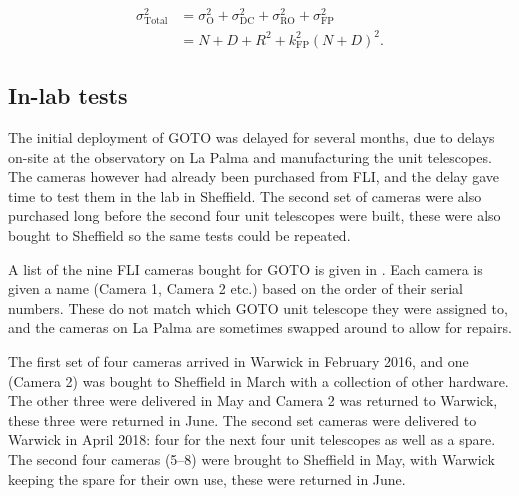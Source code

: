 \begin{colsection}
\begin{colsection}
\begin{equation}
    \begin{split}
        \sigma_\text{Total}^2 & = \sigma_\text{O}^2 +
                                  \sigma_\text{DC}^2 +
                                  \sigma_\text{RO}^2 +
                                  \sigma_\text{FP}^2 \\
                              & = N + D + R^2 + k_\text{FP}^2{(N+D)}^2.
    \end{split}
    \label{eq:noise}
\end{equation}

\end{colsection}

\newpage
\subsection{In-lab tests}
\label{sec:camera_tests}
\begin{colsection}

The initial deployment of GOTO was delayed for several months, due to delays on-site at the observatory on La Palma and manufacturing the unit telescopes. The cameras however had already been purchased from FLI, and the delay gave time to test them in the lab in Sheffield. The second set of cameras were also purchased long before the second four unit telescopes were built, these were also bought to Sheffield so the same tests could be repeated.

A list of the nine FLI cameras bought for GOTO is given in . Each camera is given a name (Camera 1, Camera 2 etc.) based on the order of their serial numbers. These do not match which GOTO unit telescope they were assigned to, and the cameras on La Palma are sometimes swapped around to allow for repairs.

The first set of four cameras arrived in Warwick in February 2016, and one (Camera 2) was bought to Sheffield in March with a collection of other hardware. The other three were delivered in May and Camera 2 was returned to Warwick, these three were returned in June. The second set cameras were delivered to Warwick in April 2018: four for the next four unit telescopes as well as a spare. The second four cameras (5--8) were brought to Sheffield in May, with Warwick keeping the spare for their own use, these were returned in June.


\end{colsection}
\end{colsection}
